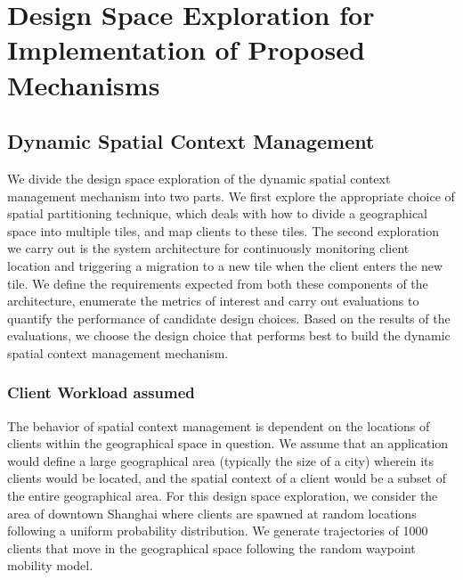 \chapter{Design Space Exploration for Implementation of Proposed Mechanisms}
\label{sec:design_space_exploration}
\section{Dynamic Spatial Context Management}

We divide the design space exploration of the dynamic spatial context management mechanism into two parts. We first explore the appropriate choice of spatial partitioning technique, which deals with how to divide a geographical space into multiple tiles, and map clients to these tiles. The second exploration we carry out is the system architecture for continuously monitoring client location and triggering a migration to a new tile when the client enters the new tile. We define the requirements expected from both these components of the architecture, enumerate the metrics of interest and carry out evaluations to quantify the performance of candidate design choices. Based on the results of the evaluations, we choose the design choice that performs best to build the dynamic spatial context management mechanism.

\subsection{Client Workload assumed}
The behavior of spatial context management is dependent on the locations of clients within the geographical space in question. We assume that an application would define a large geographical area (typically the size of a city) wherein its clients would be located, and the spatial context of a client would be a subset of the entire geographical area. For this design space exploration, we consider the area of downtown Shanghai where clients are spawned at random locations following a uniform probability distribution. We generate trajectories of 1000 clients that move in the geographical space following the random waypoint mobility model. 

